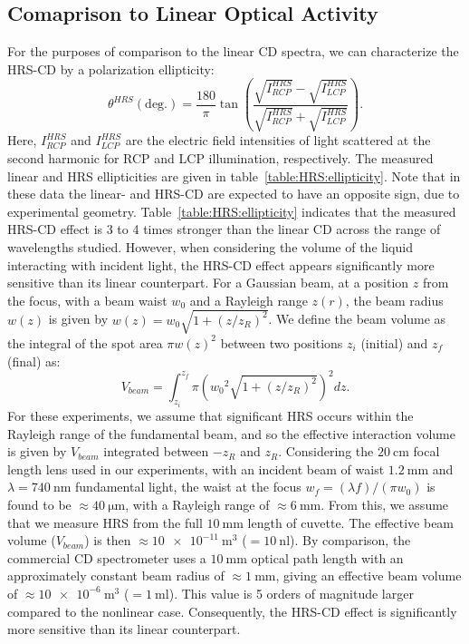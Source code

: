\subsection{Comaprison to Linear Optical Activity}
For the purposes of comparison to the linear CD spectra, we can characterize the HRS-CD by a polarization ellipticity:
\begin{equation}
    \theta^{HRS} (\text{deg.}) = \frac{180}{\pi} \tan\left( \frac{\sqrt{I_{RCP}^{HRS}} - \sqrt{I_{LCP}^{HRS}}}{\sqrt{I_{RCP}^{HRS}} + \sqrt{I_{LCP}^{HRS}}} \right).
\end{equation}
Here, $I_{RCP}^{HRS}$ and $I_{LCP}^{HRS}$ are the electric field intensities of light scattered at the second harmonic for RCP and LCP illumination, respectively. 
The measured linear and HRS ellipticities are given in table~\ref{table:HRS:ellipticity}. Note that in these data the linear- and HRS-CD are expected to have an opposite sign, due to experimental geometry.
Table~\ref{table:HRS:ellipticity} indicates that the measured HRS-CD effect is 3 to 4 times stronger than the linear CD across the range of wavelengths studied. However, when considering the volume of the liquid interacting with incident light, the HRS-CD effect appears significantly more sensitive than its linear counterpart. 
For a Gaussian beam, at a position $z$ from the focus, with a beam waist $w_0$ and a Rayleigh range $z(r)$, the beam radius $w(z)$ is given by $w(z) = {w_0}\sqrt {1 + (z/z_R)^2}$. 
We define the beam volume as the integral of the spot area $\pi w(z)^2$ between two positions $z_i$ (initial) and $z_f$ (final) as:
\begin{equation}
    V_{beam} = \int^{z_f}_{z_i} \pi \left( {w_0}^2 \sqrt {1 + (z/z_R)^2} \right)^2 dz.
\end{equation} 
For these experiments, we assume that significant HRS occurs within the Rayleigh range of the fundamental beam, and so the effective interaction volume is given by $V_{beam}$ integrated between $-z_R$ and $z_R$. 
Considering the $\SI{20}{\centi\m}$ focal length lens used in our experiments, with an incident beam of waist $\SI{1.2}{\milli\m}$ and $\lambda = \SI{740}{\nano\m}$ fundamental light, the waist at the focus ${w_f} = (\lambda f)/(\pi {w_0})$ is found to be $\approx \SI{40}{\micro\m}$, with a Rayleigh range of $\approx \SI{6}{\milli\m}$. From this, we assume that we measure HRS from the full $\SI{10}{\milli\m}$ length of cuvette. 
The effective beam volume ($V_{beam}$) is then $\approx \SI{10e-11}{\m\cubed}$ ($=\SI{10}{\nano\litre}$). 
By comparison, the commercial CD spectrometer uses a $\SI{10}{\milli\m}$ optical path length with an approximately constant beam radius of $\approx \SI{1}{\milli\m}$, giving an effective beam volume of  $\approx \SI{10e-6}{\m\cubed}$ ($=\SI{1}{\milli\litre}$). 
This value is 5 orders of magnitude larger compared to the nonlinear case. Consequently, the HRS-CD effect is significantly more sensitive than its linear counterpart. 

